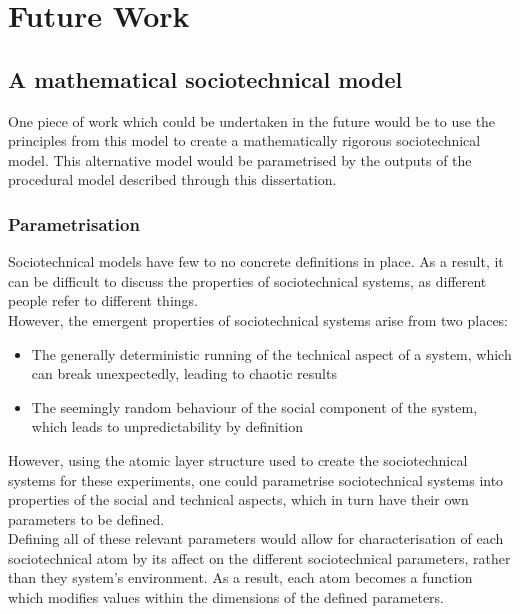 \chapter{Future Work}
\label{semantics}
\section{A mathematical sociotechnical model}
One piece of work which could be undertaken in the future would be to use the principles from this model to create a mathematically rigorous sociotechnical model. This alternative model would be parametrised by the outputs of the procedural model described through this dissertation. 
\subsection{Parametrisation}
Sociotechnical models have few to no concrete definitions in place. As a result, it can be difficult to discuss the properties of sociotechnical systems, as different people refer to different things. \\
However, the emergent properties of sociotechnical systems arise from two places:
\begin{itemize}
\item The generally deterministic running of the technical aspect of a system, which can break unexpectedly, leading to chaotic results
\item The seemingly random behaviour of the social component of the system, which leads to unpredictability by definition
\end{itemize}
However, using the atomic layer structure used to create the sociotechnical systems for these experiments, one could parametrise sociotechnical systems into properties of the social and technical aspects, which in turn have their own parameters to be defined.\\
Defining all of these relevant parameters would allow for characterisation of each sociotechnical atom by its affect on the different sociotechnical parameters, rather than they system's environment. As a result, each atom becomes a function which modifies values within the dimensions of the defined parameters. 

